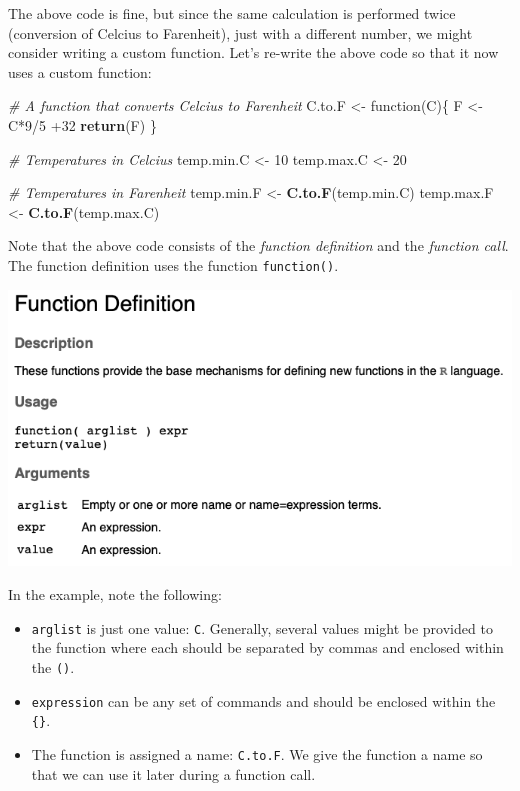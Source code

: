 \documentclass[]{book}
\newenvironment{Shaded}{\begin{snugshade}}{\end{snugshade}}
\newcommand{\KeywordTok}[1]{\textcolor[rgb]{0.13,0.29,0.53}{\textbf{{#1}}}}
\newcommand{\DecValTok}[1]{\textcolor[rgb]{0.00,0.00,0.81}{{#1}}}
\newcommand{\StringTok}[1]{\textcolor[rgb]{0.31,0.60,0.02}{{#1}}}
\newcommand{\CommentTok}[1]{\textcolor[rgb]{0.56,0.35,0.01}{\textit{{#1}}}}
\newcommand{\NormalTok}[1]{{#1}}
\begin{document}
The above code is fine, but since the same calculation is performed
twice (conversion of Celcius to Farenheit), just with a different
number, we might consider writing a custom function. Let's re-write the
above code so that it now uses a custom function:

\begin{Shaded}
\begin{Highlighting}[]
\CommentTok{# A function that converts Celcius to Farenheit}
\NormalTok{C.to.F <-}\StringTok{ }\NormalTok{function(C)\{}
  \NormalTok{F <-}\StringTok{ }\NormalTok{C*}\DecValTok{9}\NormalTok{/}\DecValTok{5} \NormalTok{+}\DecValTok{32}
  \KeywordTok{return}\NormalTok{(F)}
\NormalTok{\}}

\CommentTok{# Temperatures in Celcius}
\NormalTok{temp.min.C <-}\StringTok{ }\DecValTok{10}
\NormalTok{temp.max.C <-}\StringTok{ }\DecValTok{20}

\CommentTok{# Temperatures in Farenheit}
\NormalTok{temp.min.F <-}\StringTok{ }\KeywordTok{C.to.F}\NormalTok{(temp.min.C)}
\NormalTok{temp.max.F <-}\StringTok{ }\KeywordTok{C.to.F}\NormalTok{(temp.max.C)}
\end{Highlighting}
\end{Shaded}

Note that the above code consists of the \emph{function definition} and
the \emph{function call}. The function definition uses the function
\texttt{function()}.

\includegraphics[width=1.2\linewidth]{figures/function}

In the example, note the following:

\begin{itemize}
\item
  \texttt{arglist} is just one value: \texttt{C}. Generally, several
  values might be provided to the function where each should be
  separated by commas and enclosed within the \texttt{()}.
\item
  \texttt{expression} can be any set of commands and should be enclosed
  within the \texttt{\{\}}.
\item
  The function is assigned a name: \texttt{C.to.F}. We give the function
  a name so that we can use it later during a function call.
\end{itemize}
\end{document}
